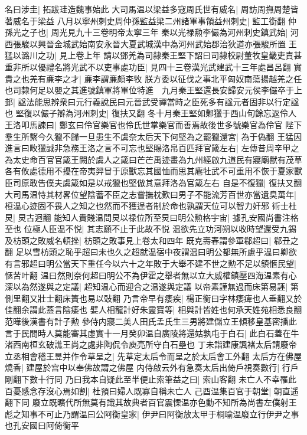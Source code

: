 名曰涉圭|{
	拓跋珪造魏事始此}
大司馬温以梁益多寇周氏世有威名|{
	周訪周撫周楚皆著威名于梁益}
八月以寧州刺史周仲孫監益梁二州諸軍事領益州刺史|{
	監工銜翻}
仲孫光之子也|{
	周光見九十三卷明帝太寧三年}
秦以光禄勲李儼為河州刺史鎮武始|{
	河西張駿以興晉金城武始南安永晉大夏武城漢中為河州武始郡治狄道亦張駿所置}
王猛以潞川之功|{
	見上卷上年}
請以鄧羌為司隸秦王堅下詔曰司隸校尉董牧皇畿吏責甚重非所以優禮名將光武不以吏事處功臣|{
	見四十三卷漢光武建武十三年處昌呂翻}
實貴之也羌有亷李之才|{
	亷李謂亷頗李牧}
朕方委以征伐之事北平匈奴南蕩揚越羌之任也司隸何足以嬰之其進號鎮軍將軍位特進　九月秦王堅還長安歸安元侯李儼卒于上邽|{
	諡法能思辨衆曰元行義說民曰元晉武受禪當時之臣死多有諡元者固非以行定諡也}
堅復以儼子辯為河州刺史|{
	復扶又翻}
冬十月秦王堅如鄴獵于西山旬餘忘返伶人王洛叩馬諫曰|{
	鄭玄曰伶官樂官也伶氏世掌樂官而善焉故後世多號樂官為伶官}
陛下羣生所繫今久獵不歸一旦患生不虞奈太后天下何堅為之罷獵還宮|{
	為于偽翻}
王猛因進言曰畋獵誠非急務王洛之言不可忘也堅賜洛帛百匹拜官箴左右|{
	左傳昔周辛甲之為太史命百官官箴王闕於虞人之箴曰芒芒禹迹畫為九州經啟九道民有寢廟獸有茂草各有攸處德用不擾在帝夷羿冒于原獸忘其國恤而思其麀牡武不可重用不恢于夏家獸臣司原敢告僕夫虞箴如是以戒獵也堅倣其意拜洛為官箴左右}
自是不復獵|{
	復扶又翻}
大司馬温恃其材畧位望陰蓄不臣之志嘗撫枕歎曰男子不能流芳百世亦當遺臭萬年|{
	桓温心迹固不畏人之知之也然而不獲逞者制於命也孰謂天位可以智力奸邪}
術士杜炅|{
	炅古迥翻}
能知人貴賤温問炅以禄位所至炅曰明公勲格宇宙|{
	據孔安國尚書注格至也}
位極人臣温不悦|{
	其志願不止于此故不悦}
温欲先立功河朔以收時望還受九錫及枋頭之敗威名頓挫|{
	枋頭之敗事見上卷太和四年}
既克壽春謂參軍郗超曰|{
	郗丑之翻}
足以雪枋頭之恥乎超曰未也久之超就温宿中夜謂温曰明公都無所慮乎温曰卿欲有言邪超曰明公當天下重任今以六十之年敗于大舉不建不世之勲不足以鎮愜民望|{
	愜苦叶翻}
温曰然則奈何超曰明公不為伊霍之舉者無以立大威權鎮壓四海温素有心深以為然遂與之定議|{
	超知温心而迎合之温遂與定議}
以帝素謹無過而床第易誣|{
	第側里翻又壯士翻床簀也易以䜴翻}
乃言帝早有痿疾|{
	楊正衡曰字林痿痺也人垂翻又於佳翻余謂此蓋言陰痿也}
嬖人相龍計好朱靈寶等|{
	相與計皆姓也何承天姓苑相悉良翻范曄後漢書有計子勲}
參侍内寢二美人田氏孟氏生三男將建儲立王傾移皇基密播此言于民間時人莫能審其虛實十一月癸卯温自廣陵將還姑孰屯于白石|{
	此白石蓋在牛渚西南桓玄破譙王尚之處非陶侃令庾亮所守白石壘也}
丁未詣建康諷褚太后請廢帝立丞相會稽王昱并作令草呈之|{
	先草定太后令而呈之於太后會工外翻}
太后方在佛屋燒香|{
	建屋於宫中以奉佛故謂之佛屋}
内侍啟云外有急奏太后出倚戶視奏數行|{
	行戶剛翻下數十行同}
乃曰我本自疑此至半便止索筆益之曰|{
	索山客翻}
未亡人不幸罹此百憂感念存沒心焉如割|{
	杜預曰婦人既寡自稱未亡人}
己酉温集百官于朝堂|{
	朝直遥翻下同}
廢立既曠代所無莫有識其故典者百官震慄温亦色動不知所為尚書左僕射王彪之知事不可止乃謂温曰公阿衡皇家|{
	伊尹曰阿衡放太甲于桐喻温廢立行伊尹之事也孔安國曰阿倚衡平}

